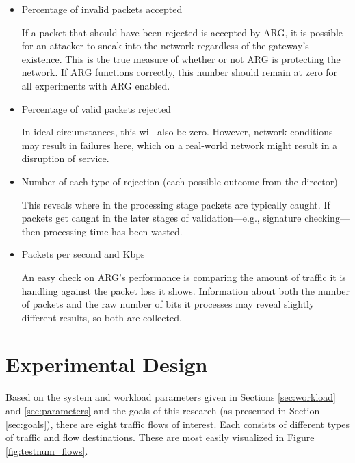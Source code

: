 \begin{itemize}
\item Percentage of invalid packets accepted
	\par If a packet that should have been rejected is accepted by \ac{ARG}, it is possible for an attacker to sneak into the network regardless of the gateway's existence. This is the true measure of whether or not \ac{ARG} is protecting the network. If \ac{ARG} functions correctly, this number should remain at zero for all experiments with \ac{ARG} enabled.

\item Percentage of valid packets rejected
	\par In ideal circumstances, this will also be zero. However, network conditions may result in failures here, which on a real-world network might result in a disruption of service. 

\item Number of each type of rejection (each possible outcome from the director)
	\par This reveals where in the processing stage packets are typically caught. If packets get caught in the later stages of validation---e.g., signature checking---then processing time has been wasted.

\item Packets per second and \acf{Kbps}
	\par An easy check on \ac{ARG}'s performance is comparing the amount of traffic it is handling against the packet loss it shows. Information about both the number of packets and the raw number of bits it processes may reveal slightly different results, so both are collected.
\end{itemize}

\section{Experimental Design}
\label{sec:exp_design}
\par Based on the system and workload parameters given in Sections \ref{sec:workload} and \ref{sec:parameters} and the goals of this research (as presented in Section \ref{sec:goals}), there are eight traffic flows of interest. Each consists of different types of traffic and flow destinations. These are most easily visualized in Figure \ref{fig:testnum_flows}.


